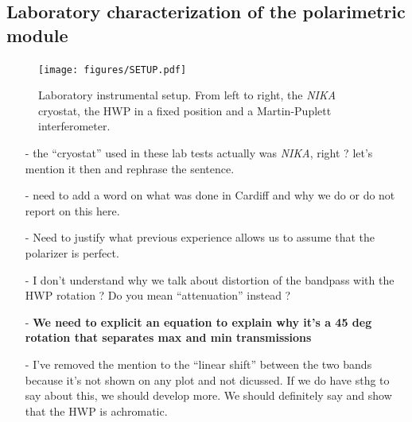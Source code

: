 \documentclass[twocolumn,traditabstract]{aa}
\newcommand{\nika}{{\it NIKA}}
\begin{document}
{%

\subsection{Laboratory characterization of the polarimetric module}
\label{lab characterization}

\begin{figure}
  \begin{center}
    \texttt{[image: figures/SETUP.pdf]}
    \caption{ Laboratory instrumental setup. From left to right,
      the {\it NIKA} cryostat, the HWP in a fixed position and a Martin-Puplett
      interferometer.}
    \label{fig:setup_lab}
  \end{center}
\end{figure}

{\color{red}
\begin{itemize}
\item[-] the ``cryostat'' used in these lab tests actually was \nika, right
  ? let's mention it then and rephrase the sentence.
\item[-] need to add a word on what was done in Cardiff and
  why we do or do not report on this here.
\item[-] Need to justify what previous experience allows us to assume that the
  polarizer is perfect.
\item[-] I don't understand why we talk about distortion of the bandpass with
  the HWP rotation ? Do you mean ``attenuation'' instead ?
\item[-] {\bf We need to explicit an equation to explain why it's a 45 deg
  rotation that separates max and min transmissions}
\item[-] I've removed the mention to the ``linear shift'' between the two bands
  because it's not shown on any plot and not dicussed. If we do have sthg to say
  about this, we should develop more. We should definitely say and show that the
  HWP is achromatic.
\end{itemize}
}

}
\end{document}
